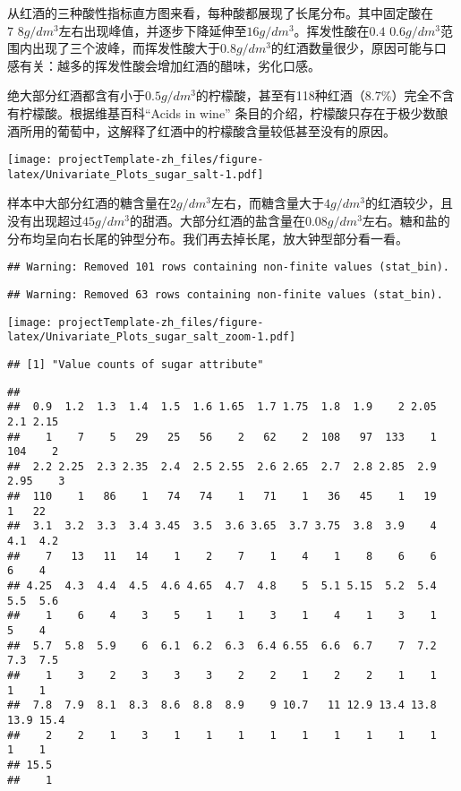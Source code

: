 \documentclass[]{article}
\begin{document}
从红酒的三种酸性指标直方图来看，每种酸都展现了长尾分布。其中固定酸在\(7\text{~}8g/dm^3\)左右出现峰值，并逐步下降延伸至\(16g/dm^3\)。挥发性酸在\(0.4\text{~}0.6g/dm^3\)范围内出现了三个波峰，而挥发性酸大于\(0.8g/dm^3\)的红酒数量很少，原因可能与口感有关：越多的挥发性酸会增加红酒的醋味，劣化口感。

绝大部分红酒都含有小于\(0.5g/dm^3\)的柠檬酸，甚至有118种红酒（8.7\%）完全不含有柠檬酸。根据维基百科``Acids
in wine''
条目的介绍，柠檬酸只存在于极少数酿酒所用的葡萄中，这解释了红酒中的柠檬酸含量较低甚至没有的原因。

\texttt{[image: projectTemplate-zh\_files/figure-latex/Univariate\_Plots\_sugar\_salt-1.pdf]}

样本中大部分红酒的糖含量在\(2g/dm^3\)左右，而糖含量大于\(4g/dm^3\)的红酒较少，且没有出现超过\(45g/dm^3\)的甜酒。大部分红酒的盐含量在\(0.08g/dm^3\)左右。糖和盐的分布均呈向右长尾的钟型分布。我们再去掉长尾，放大钟型部分看一看。

\begin{verbatim}
## Warning: Removed 101 rows containing non-finite values (stat_bin).
\end{verbatim}

\begin{verbatim}
## Warning: Removed 63 rows containing non-finite values (stat_bin).
\end{verbatim}

\texttt{[image: projectTemplate-zh\_files/figure-latex/Univariate\_Plots\_sugar\_salt\_zoom-1.pdf]}

\begin{verbatim}
## [1] "Value counts of sugar attribute"
\end{verbatim}

\begin{verbatim}
## 
##  0.9  1.2  1.3  1.4  1.5  1.6 1.65  1.7 1.75  1.8  1.9    2 2.05  2.1 2.15 
##    1    7    5   29   25   56    2   62    2  108   97  133    1  104    2 
##  2.2 2.25  2.3 2.35  2.4  2.5 2.55  2.6 2.65  2.7  2.8 2.85  2.9 2.95    3 
##  110    1   86    1   74   74    1   71    1   36   45    1   19    1   22 
##  3.1  3.2  3.3  3.4 3.45  3.5  3.6 3.65  3.7 3.75  3.8  3.9    4  4.1  4.2 
##    7   13   11   14    1    2    7    1    4    1    8    6    6    6    4 
## 4.25  4.3  4.4  4.5  4.6 4.65  4.7  4.8    5  5.1 5.15  5.2  5.4  5.5  5.6 
##    1    6    4    3    5    1    1    3    1    4    1    3    1    5    4 
##  5.7  5.8  5.9    6  6.1  6.2  6.3  6.4 6.55  6.6  6.7    7  7.2  7.3  7.5 
##    1    3    2    3    3    3    2    2    1    2    2    1    1    1    1 
##  7.8  7.9  8.1  8.3  8.6  8.8  8.9    9 10.7   11 12.9 13.4 13.8 13.9 15.4 
##    2    2    1    3    1    1    1    1    1    1    1    1    1    1    1 
## 15.5 
##    1
\end{verbatim}
\end{document}
